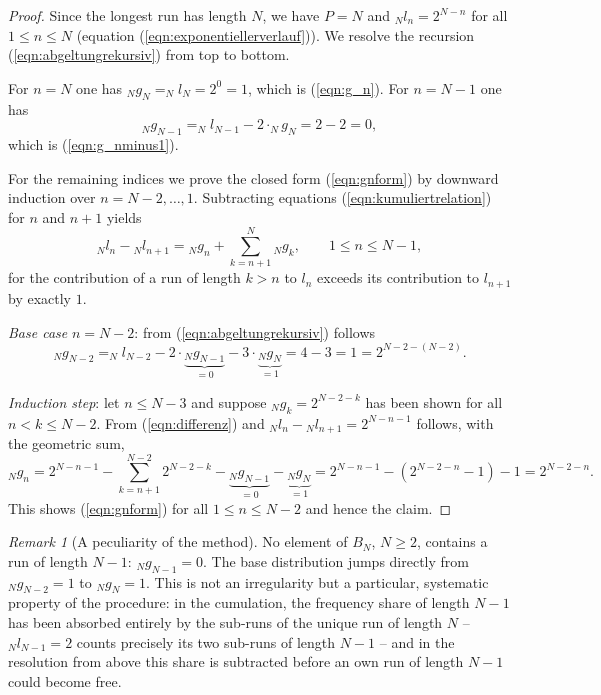 \documentclass[11pt,a4paper]{scrartcl}
\theoremstyle{plain}
\theoremstyle{definition}
\theoremstyle{remark}
\newtheorem{bem}[satz]{Remark}
\begin{document}
\begin{proof}
Since the longest run has length $N$, we have $P=N$ and
$_Nl_n=2^{N-n}$ for all $1\leq n\leq N$ (equation
(\ref{eqn:exponentiellerverlauf})). We resolve the recursion
(\ref{eqn:abgeltungrekursiv}) from top to bottom.

For $n=N$ one has $_Ng_N=_Nl_N=2^{0}=1$, which is
(\ref{eqn:g_n}). For $n=N-1$ one has
\begin{equation*}
  _Ng_{N-1}=_Nl_{N-1}-2\cdot _Ng_N=2-2=0,
\end{equation*}
which is (\ref{eqn:g_nminus1}).

For the remaining indices we prove the closed form (\ref{eqn:gnform})
by downward induction over $n=N-2,\dots,1$. Subtracting equations
(\ref{eqn:kumuliertrelation}) for $n$ and $n+1$ yields
\begin{equation}\label{eqn:differenz}
  {}_Nl_n-{}_Nl_{n+1}= {}_Ng_n+\sum_{k=n+1}^{N} {}_Ng_k,\qquad 1\leq n\leq N-1,
\end{equation}
for the contribution of a run of length $k>n$ to $l_n$ exceeds its
contribution to $l_{n+1}$ by exactly $1$.

\emph{Base case} $n=N-2$: from (\ref{eqn:abgeltungrekursiv}) follows
\begin{equation*}
  _Ng_{N-2}=_Nl_{N-2}-2\cdot\underbrace{_Ng_{N-1}}_{=0}
  -3\cdot\underbrace{_Ng_N}_{=1}
  =4-3=1=2^{N-2-(N-2)}.
\end{equation*}

\emph{Induction step}: let $n\leq N-3$ and suppose
$_Ng_k=2^{N-2-k}$ has been shown for all $n<k\leq N-2$. From
(\ref{eqn:differenz}) and
${}_Nl_n-{}_Nl_{n+1}=2^{N-n-1}$ follows, with the geometric sum,
\begin{equation*}
  _Ng_n
  =2^{N-n-1}-\sum_{k=n+1}^{N-2}2^{N-2-k}
  -\underbrace{_Ng_{N-1}}_{=0}-\underbrace{_Ng_N}_{=1}
  =2^{N-n-1}-\left(2^{N-2-n}-1\right)-1
  =2^{N-2-n}.
\end{equation*}
This shows (\ref{eqn:gnform}) for all $1\leq n\leq N-2$ and hence the
claim.
\end{proof}

\begin{bem}[A peculiarity of the method]\label{bem:keinlaufnminus1}
No element of $B_N$, $N\geq 2$, contains a run of length $N-1$:
$_Ng_{N-1}=0$. The base distribution jumps directly from
$_Ng_{N-2}=1$ to $_Ng_N=1$. This is not an irregularity but a
particular, systematic property of the procedure: in the cumulation,
the frequency share of length $N-1$ has been absorbed entirely by the
sub-runs of the unique run of length $N$ -- $_Nl_{N-1}=2$ counts
precisely its two sub-runs of length $N-1$ -- and in the resolution
from above this share is subtracted before an own run of length $N-1$
could become free.
\end{bem}
\end{document}
